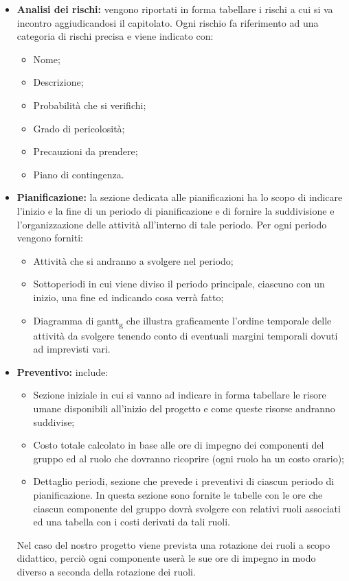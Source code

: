 \begin{itemize}
\item \textbf{Analisi dei rischi:} vengono riportati in forma tabellare i rischi a cui si va incontro aggiudicandosi il capitolato.
Ogni rischio fa riferimento ad una categoria di rischi precisa e viene indicato con:
\begin{itemize}
    \item Nome;
    \item Descrizione;
    \item Probabilità che si verifichi;
    \item Grado di pericolosità;
    \item Precauzioni da prendere;
    \item Piano di contingenza.
\end{itemize}
\item \textbf{Pianificazione:} la sezione dedicata alle pianificazioni ha lo scopo di indicare l'inizio e la fine di un periodo di pianificazione e 
di fornire la suddivisione e l'organizzazione delle attività all'interno di tale periodo. Per ogni periodo vengono forniti:
\begin{itemize}
    \item Attività che si andranno a svolgere nel periodo;
    \item Sottoperiodi in cui viene diviso il periodo principale, ciascuno con un inizio, una fine ed indicando cosa verrà fatto;
    \item Diagramma di gantt\textsubscript{g} che illustra graficamente l'ordine temporale delle attività da svolgere tenendo conto di 
    eventuali margini temporali dovuti ad imprevisti vari.
\end{itemize}

\item \textbf{Preventivo:} include: 
\begin{itemize}
    \item Sezione iniziale in cui si vanno ad indicare in forma tabellare le risore umane disponibili all'inizio del progetto e 
    come queste risorse andranno suddivise;
    \item Costo totale calcolato in base alle ore di impegno dei componenti del gruppo ed al ruolo che dovranno ricoprire (ogni ruolo ha un costo orario);
    \item Dettaglio periodi, sezione che prevede i preventivi di ciascun periodo di pianificazione.
    In questa sezione sono fornite le tabelle con le ore che ciascun componente del gruppo dovrà svolgere con relativi ruoli associati ed una tabella con i costi
    derivati da tali ruoli.
\end{itemize}
Nel caso del nostro progetto viene prevista una rotazione dei ruoli a scopo didattico, perciò ogni componente userà le sue ore di impegno in modo diverso 
a seconda della rotazione dei ruoli.
\end{itemize}